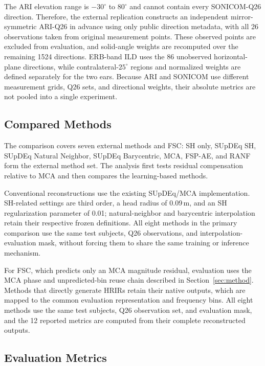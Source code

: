 \documentclass[UTF8,a4paper]{article}
\begin{document}
The ARI elevation range is $-30^\circ$ to $80^\circ$ and cannot contain every SONICOM-Q26 direction. Therefore, the external replication constructs an independent mirror-symmetric ARI-Q26 in advance using only public direction metadata, with all 26 observations taken from original measurement points. These observed points are excluded from evaluation, and solid-angle weights are recomputed over the remaining 1524 directions. ERB-band ILD uses the 86 unobserved horizontal-plane directions, while contralateral-$25^\circ$ regions and normalized weights are defined separately for the two ears. Because ARI and SONICOM use different measurement grids, Q26 sets, and directional weights, their absolute metrics are not pooled into a single experiment.

\subsection{Compared Methods}

The comparison covers seven external methods and FSC: SH only, SUpDEq SH, SUpDEq Natural Neighbor, SUpDEq Barycentric, MCA, FSP-AE, and RANF form the external method set. The analysis first tests residual compensation relative to MCA and then compares the learning-based methods.

Conventional reconstructions use the existing SUpDEq/MCA implementation. SH-related settings are third order, a head radius of 0.09\,m, and an SH regularization parameter of 0.01; natural-neighbor and barycentric interpolation retain their respective frozen definitions. All eight methods in the primary comparison use the same test subjects, Q26 observations, and interpolation-evaluation mask, without forcing them to share the same training or inference mechanism.

For FSC, which predicts only an MCA magnitude residual, evaluation uses the MCA phase and unpredicted-bin reuse chain described in Section~\ref{sec:method}. Methods that directly generate HRIRs retain their native outputs, which are mapped to the common evaluation representation and frequency bins. All eight methods use the same test subjects, Q26 observation set, and evaluation mask, and the 12 reported metrics are computed from their complete reconstructed outputs.

\subsection{Evaluation Metrics}
\end{document}
